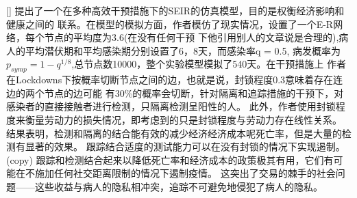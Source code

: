                 [\cite{kolumbus2021effectiveness}] 提出了一个在多种高效干预措施下的SEIR的仿真模型，目的是权衡经济影响和健康之间的
                联系。在模型的模拟方面，作者模仿了现实情况，设置了一个E-R网络，每个节点的平均度为3.6(在没有任何干预
                下他引用别人的文章说是合理的),病人的平均潜伏期和平均感染期分别设置了6，8天，而感染率q = 0.5,
                病发概率为$p_{symp} = 1 - q^{1/8}$,总节点数10000，整个实验模型模拟了540天。在干预措施上
                作者在Lockdowns下按概率切断节点之间的边，也就是说，封锁程度0.3意味着存在连边的两个节点的边可能
                有30\%的概率会切断，针对隔离和追踪措施的干预下，对感染者的直接接触者进行检测，只隔离检测呈阳性的人。
                此外，作者使用封锁程度来衡量劳动力的损失情况，即考虑到的只是封锁程度与劳动力存在线性关系。
                结果表明，检测和隔离的结合能有效的减少经济经济成本呢死亡率，但是大量的检测有显著的效果。
                跟踪结合适度的测试能力可以在没有封锁的情况下实现遏制。(copy)
                跟踪和检测结合起来以降低死亡率和经济成本的政策极其有用，它们有可能在不施加任何社交距离限制的情况下遏制疫情。
                这突出了交易的棘手的社会问题——这些收益与病人的隐私相冲突，追踪不可避免地侵犯了病人的隐私。

